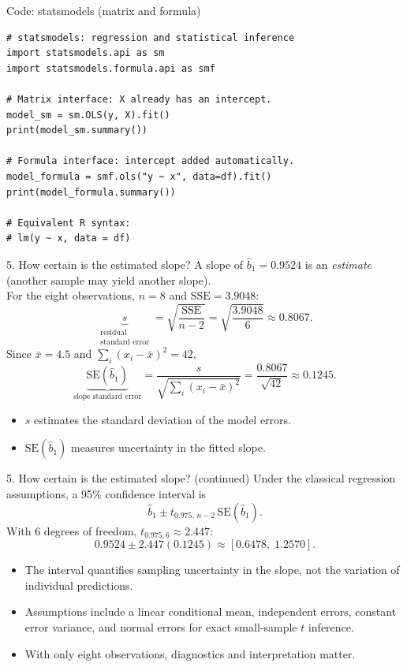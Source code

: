 \documentclass[aspectratio=43,11pt]{beamer}
\begin{document}
\begin{frame}[fragile]{Code: statsmodels (matrix and formula)}
\small
\color{maroon}
\begin{verbatim}
# statsmodels: regression and statistical inference
import statsmodels.api as sm
import statsmodels.formula.api as smf

# Matrix interface: X already has an intercept.
model_sm = sm.OLS(y, X).fit()
print(model_sm.summary())

# Formula interface: intercept added automatically.
model_formula = smf.ols("y ~ x", data=df).fit()
print(model_formula.summary())

# Equivalent R syntax:
# lm(y ~ x, data = df)
\end{verbatim}
\end{frame}


\begin{frame}{5. How certain is the estimated slope?}
\small
A slope of $\widehat b_1=0.9524$ is an \emph{estimate} (another sample may yield another slope).\\
\medskip
For the eight observations, $n=8$ and $\mathrm{SSE}=3.9048$:
\[
\underbrace{s}_{\substack{\text{residual}\\\text{standard error}}}
=\sqrt{\frac{\mathrm{SSE}}{n-2}}
=\sqrt{\frac{3.9048}{6}}\approx\boxed{0.8067}.
\]
Since $\bar x=4.5$ and $\sum_i(x_i-\bar x)^2=42$,
\[
\underbrace{\mathrm{SE}(\widehat b_1)}_{\text{slope standard error}}
=\frac{s}{\sqrt{\sum_i(x_i-\bar x)^2}}
=\frac{0.8067}{\sqrt{42}}\approx\boxed{0.1245}.
\]
\begin{itemize}
\item $s$ estimates the standard deviation of the model errors.
\item $\mathrm{SE}(\widehat b_1)$ measures uncertainty in the fitted slope.
\end{itemize}
\end{frame}

\begin{frame}{5. How certain is the estimated slope? (continued)}
\small
Under the classical regression assumptions, a 95\% confidence interval is
\[
\widehat b_1\pm t_{0.975,\,n-2}\,\mathrm{SE}(\widehat b_1).
\]
With $6$ degrees of freedom, $t_{0.975,6}\approx2.447$:
\[
0.9524\pm2.447(0.1245)
\approx\boxed{[0.6478,\;1.2570]}.
\]
\begin{itemize}
\item The interval quantifies sampling uncertainty in the slope, not the variation of individual predictions.
\item Assumptions include a linear conditional mean, independent errors, constant error variance, and normal errors for exact small-sample $t$ inference.
\item With only eight observations, diagnostics and interpretation matter.
\end{itemize}
\end{frame}
\end{document}
